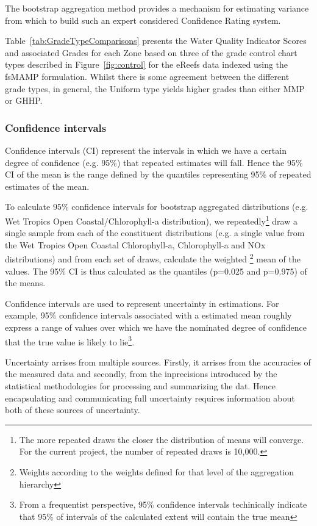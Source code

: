The bootstrap aggregation method provides a mechanism for estimating variance from which to build
such an expert considered Confidence Rating system.
  

Table~\ref{tab:GradeTypeComparisons} presents the Water Quality Indicator Scores and associated
Grades for each Zone based on three of the grade control chart types described in
Figure~\ref{fig:control} for the eReefs data indexed using the fsMAMP formulation.  Whilst there is
some agreement between the different grade types, in general, the Uniform type yields higher grades
than either MMP or GHHP.

                                 



\subsubsection{Confidence intervals}

Confidence intervals (CI) represent the intervals in which we have a certain degree of confidence
(e.g. 95\%) that repeated estimates will fall.  Hence the 95\% CI of the mean is the range defined
by the quantiles representing 95\% of repeated estimates of the mean.

To calculate 95\% confidence intervals for bootstrap aggregated distributions (e.g. Wet Tropics Open Coastal/Chlorophyll-a
distribution), we repeatedly\footnote{The more repeated draws the closer the distribution of means
will converge.  For the current project, the number of repeated draws is 10,000.}  draw a single
sample from each of the constituent distributions (e.g. a single value from the Wet Tropics Open Coastal Chlorophyll-a,
Chlorophyll-a and NOx distributions) and from each set of draws, calculate the weighted
\footnote{Weights according to the weights defined for that level of the aggregation hierarchy} mean
of the values.  The 95\% CI is thus calculated as the quantiles (p=0.025 and p=0.975) of the means.

Confidence intervals are used to represent uncertainty in estimations.
For example, 95\% confidence intervals associated with a estimated mean roughly express a range
of values over which we have the nominated degree of confidence that the true value is likely to
lie\footnote{From a frequentist perspective, 95\% confidence intervals techinically indicate that
  95\% of intervals of the calculated extent will contain the true mean}.

Uncertainty arrises from multiple sources.  Firstly, it arrises from the accuracies of the measured data
and secondly, from the inprecisions introduced by the statistical methodologies for processing and summarizing
the dat.  Hence encapsulating and communicating full uncertainty requires information about both of these
sources of uncertainty.

